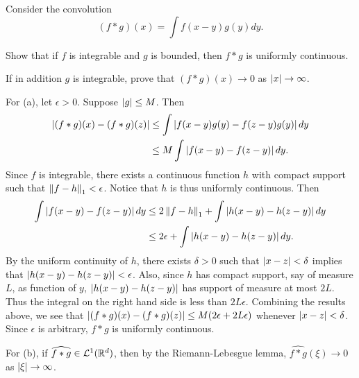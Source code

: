 \begin{exercise}
    Consider the convolution 
    \begin{equation*}
        (f*g)(x) = \int f(x-y)g(y)dy.
    \end{equation*}
    \begin{thmenum}
        \item Show that if $f$ is integrable and $g$ is bounded, then $f*g$ is uniformly 
        continuous.
        \item If in addition $g$ is integrable, prove that $(f*g)(x)\to 0$ as $\left\lvert {x} \right\rvert\to\infty$. 
    \end{thmenum}
\end{exercise}
\begin{pf}
    For (a), let $\epsilon>0$. Suppose $\left\lvert {g} \right\rvert\leq M$. Then 
    \begin{equation*}
        \begin{split}
            \left\lvert {(f*g)(x)-(f*g)(z)} \right\rvert &\leq \int \left\lvert {f(x-y)g(y)-f(z-y)g(y)} \right\rvert dy \\ 
            &\leq M\int \left\lvert {f(x-y)-f(z-y)} \right\rvert dy.
        \end{split}
    \end{equation*}
    Since $f$ is integrable, there exists a continuous function $h$ with compact 
    support such that $\left\lVert {f-h} \right\rVert_1<\epsilon$. Notice that $h$ is thus uniformly 
    continuous. Then  
    \begin{equation*}
        \begin{split}
            \int \left\lvert {f(x-y)-f(z-y)} \right\rvert dy &\leq 2\left\lVert {f-h} \right\rVert_1 + \int \left\lvert {h(x-y)-h(z-y)} \right\rvert dy \\
            &\leq 2\epsilon + \int \left\lvert {h(x-y)-h(z-y)} \right\rvert dy.
        \end{split}
    \end{equation*}
    By the uniform continuity of $h$, there exists $\delta>0$ such that 
    $\left\lvert {x-z} \right\rvert<\delta$ implies that $\left\lvert {h(x-y)-h(z-y)} \right\rvert<\epsilon$. Also, 
    since $h$ has compact support, say of measure $L$, as function of $y$, 
    $\left\lvert {h(x-y)-h(z-y)} \right\rvert$ has support of measure at most $2L$. Thus the 
    integral on the right hand side is less than $2L\epsilon$. Combining 
    the results above, we see that $\left\lvert {(f*g)(x)-(f*g)(z)} \right\rvert
    \leq M(2\epsilon + 2L\epsilon)$ whenever $\left\lvert {x-z} \right\rvert<\delta$. Since 
    $\epsilon$ is arbitrary, $f*g$ is uniformly continuous.

    For (b), if $\widehat{f*g}\in\mathcal{L}^1(\mathbb{R}^d)$, then by the Riemann-Lebesgue 
    lemma, $\widehat{f*g}(\xi)\to 0$ as $\left\lvert {\xi} \right\rvert\to\infty$. 
\end{pf}
